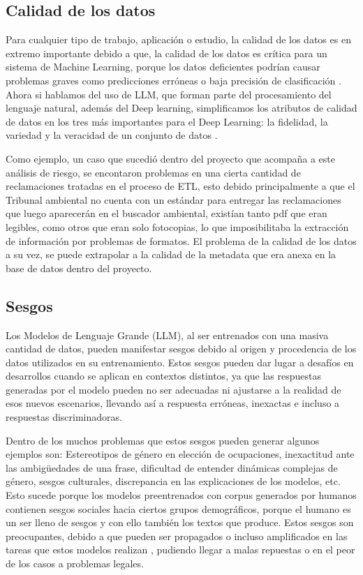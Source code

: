\newpage

\subsection{Calidad de los datos}

Para cualquier tipo de trabajo, aplicación o estudio, la calidad de los datos es en extremo importante debido a que, la calidad de los datos 
es crítica para un sistema de Machine Learning, porque los datos deficientes podrían causar problemas graves como predicciones erróneas o baja 
precisión de clasificación \cite{calidad1}. Ahora si hablamos del uso de LLM, que forman parte del procesamiento del lenguaje natural, además del Deep learning, 
simplificamos los atributos de calidad de datos en los tres más importantes para el Deep Learning: la fidelidad, la variedad y la veracidad de un conjunto de datos \cite{calidad1}.

Como ejemplo, un caso que sucedió dentro del proyecto que acompaña a este análisis de riesgo, se encontaron problemas en una cierta cantidad de reclamaciones tratadas en el proceso 
de ETL, esto debido principalmente a que el Tribunal ambiental no cuenta con un estándar para entregar las reclamaciones que luego aparecerán en el buscador ambiental, existían tanto pdf que eran legibles, como otros 
que eran solo fotocopias, lo que imposibilitaba la extracción de información por problemas de formatos. El problema de la calidad de los datos a su vez, se puede extrapolar a la 
calidad de la metadata que era anexa en la base de datos dentro del proyecto.

\subsection{Sesgos} %

Los Modelos de Lenguaje Grande (LLM), al ser entrenados con una masiva cantidad de datos, pueden manifestar sesgos debido al origen y procedencia de los datos utilizados en su entrenamiento. Estos sesgos pueden dar lugar a desafíos en desarrollos cuando se aplican en 
contextos distintos, ya que las respuestas generadas por el modelo pueden no ser adecuadas ni ajustarse a la realidad de 
esos nuevos escenarios, llevando así a respuesta erróneas, inexactas e incluso a respuestas discriminadoras.

Dentro de los muchos problemas que estos sesgos pueden generar algunos ejemplos son: 
Estereotipos de género en elección de ocupaciones, inexactitud ante las ambigüedades de una frase, dificultad de entender dinámicas complejas de género, sesgos culturales, discrepancia en las explicaciones de los modelos, etc. \cite{bias1}
Esto sucede porque los modelos preentrenados con corpus generados por humanos contienen sesgos sociales hacia ciertos grupos demográficos, porque el humano es un ser lleno de sesgos y con ello también los textos que produce. Estos sesgos son preocupantes, debido a que pueden ser propagados o incluso amplificados en las tareas que estos modelos realizan \cite{sesgo2}, pudiendo llegar a malas repuestas o en el peor de los casos a problemas legales.

